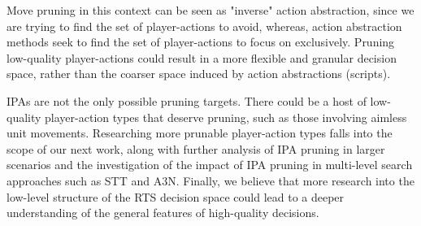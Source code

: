 \documentclass[conference]{IEEEtran}
\begin{document}
Move pruning in this context can be seen as "inverse" action abstraction, since we are trying to find the set of player-actions to avoid, whereas, action abstraction methods seek to find the set of player-actions to focus on exclusively. Pruning low-quality player-actions could result in a more flexible and granular decision space, rather than the coarser space induced by action abstractions (scripts).

IPAs are not the only possible pruning targets. There could be a host of low-quality player-action types that deserve pruning, such as those involving aimless unit movements. Researching more prunable player-action types falls into the scope of our next work, along with further analysis of IPA pruning in larger scenarios and the investigation of the impact of IPA pruning in multi-level search approaches such as STT\cite{barriga_combining_2017} and A3N\cite{moraes_action_2018}. Finally, we believe that more research into the low-level structure of the RTS decision space could lead to a deeper understanding of the general features of high-quality decisions.






\end{document}
